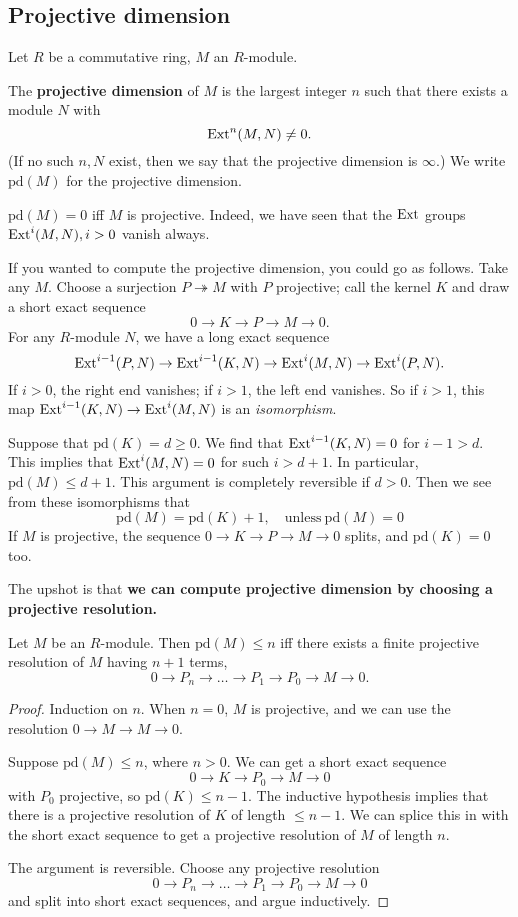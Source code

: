\subsection{Projective dimension}

\newcommand{\pr}{\mathrm{pd}}
Let $R$ be a commutative ring, $M$ an $R$-module. 

\begin{definition} 
The \textbf{projective dimension} of $M$ is the largest integer
$n$ such that
there exists  a module $N$ with
\[ \mathrm{Ext}^n(M,N) \neq 0.  \]
(If no such $n,N$ exist, then we say that the projective
dimension is $\infty$.)
We write $\pr(M)$ for the projective dimension.
\end{definition} 

\begin{remark} 
$\pr(M) = 0$ iff $M$ is projective. Indeed, we have seen that
the $\mathrm{Ext}$ groups
$\mathrm{Ext}^i(M,N), i >0$
vanish always.
\end{remark} 

If you wanted to compute the projective dimension, you could go
as follows.
Take any $M$. Choose a surjection $P \twoheadrightarrow M$ with
$P$ projective;
call the kernel $K$ and draw a short exact sequence
\[ 0 \to K \to P \to M \to 0.  \]
For any $R$-module $N$, we have a long exact sequence
\[ \mathrm{Ext}^{i-1}(P,N) \to \mathrm{Ext}^{i-1}(K,N) \to \mathrm{Ext}^i(M,N) \to
\mathrm{Ext}^i(P, N). \]
If $i >0$, the right end vanishes; if $i >1$, the left end
vanishes. So if $i
>1$, this map $\mathrm{Ext}^{i-1}(K,N) \to \mathrm{Ext}^i(M,N)$ is an
\emph{isomorphism}.

Suppose that $\pr(K) = d \geq 0$. We find that
$\mathrm{Ext}^{i-1}(K,N)=0$ for $i-1
> d$.  
This implies that $\mathrm{Ext}^i(M,N) = 0$ for such $i > d+1$. In
particular, $\pr(M)
\leq d+1$.
This argument is completely reversible if $d >0$.
Then we see from these isomorphisms that
\[ \boxed{\pr(M) = \pr(K)+1}, \quad \mathrm{unless} \ \pr(M)=0
\]
If $M$ is projective, the sequence $0 \to K \to P \to M \to 0$
splits, and
$\pr(K)=0$ too.

The upshot is that \textbf{we can compute projective dimension
by choosing a
projective resolution.}
\begin{proposition} 
Let $M$ be an $R$-module. Then $\pr(M) \leq n$ iff there exists
a finite
projective resolution of $M$ having $n+1$ terms, 
\[ 0 \to P_n \to \dots \to P_1 \to P_0 \to M \to 0.  \]
\end{proposition} 
\begin{proof} 
Induction on $n$. When $n = 0$, $M$ is projective, and we can
use the
resolution $0 \to M \to M \to 0$.

Suppose $\pr(M) \leq n$, where $n >0$. We can get a short exact
sequence
\[ 0 \to K \to P_0 \to M \to 0  \]
with $P_0$ projective, so $\pr(K) \leq n-1$. The inductive
hypothesis implies
that there is a projective resolution of $K$ of length $\leq
n-1$. We can
splice this in with the short exact sequence to get a projective
resolution of
$M$ of length $n$.

The argument is reversible. Choose any projective resolution
\[  0 \to P_n \to \dots \to P_1 \to P_0 \to M \to 0 \]
and split into short exact sequences, and argue inductively.
\end{proof} 


